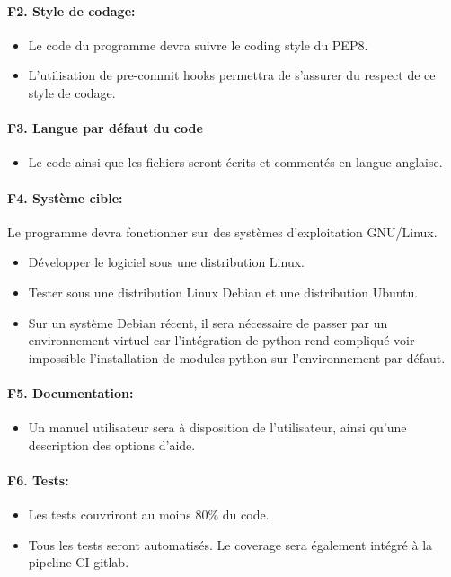 \documentclass[a4paper,12pt]{article}
\begin{document}
\paragraph{F2. Style de codage:}
\begin{itemize}
  \item Le code du programme devra suivre le coding style du PEP8.
  \item L'utilisation de pre-commit hooks permettra de s'assurer du respect de ce style
        de codage.
\end{itemize}

\paragraph{F3. Langue par défaut du code}
\begin{itemize}
  \item Le code ainsi que les fichiers seront écrits et commentés en langue anglaise.
\end{itemize}

\paragraph{F4. Système cible:}
Le programme devra fonctionner sur des systèmes d’exploitation GNU/Linux.
\begin{itemize}
  \item Développer le logiciel sous une distribution Linux.
  \item Tester sous une distribution Linux Debian et une distribution Ubuntu.
  \item Sur un système Debian récent, il sera nécessaire de passer par un environnement
        virtuel car l'intégration de python rend compliqué voir impossible
        l'installation de modules python sur l'environnement par défaut.
\end{itemize}

\paragraph{F5. Documentation:}
\begin{itemize}
  \item Un manuel utilisateur sera à disposition de l'utilisateur, ainsi qu'une
        description des options d'aide.
\end{itemize}

\paragraph{F6. Tests:}
\begin{itemize}
  \item Les tests couvriront au moins 80\% du code.
  \item Tous les tests seront automatisés. Le coverage sera également intégré à la
        pipeline CI gitlab.
\end{itemize}
\end{document}
